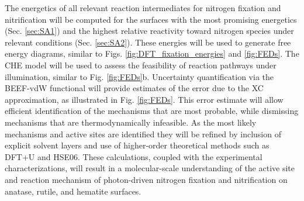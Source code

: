 The energetics of all relevant reaction intermediates for nitrogen fixation and nitrification will be computed for the surfaces with the most promising energetics (Sec. \ref{sec:SA1}) and the highest relative reactivity toward nitrogen species under relevant conditions (Sec. \ref{sec:SA2}). These energies will be used to generate free energy diagrams, similar to Figs. \ref{fig:DFT_fixation_energies} and \ref{fig:FEDs}. The CHE model will be used to assess the feasibility of reaction pathways under illumination, similar to Fig. \ref{fig:FEDs}b. Uncertainty quantification via the BEEF-vdW functional will provide estimates of the error due to the XC approximation, as illustrated in Fig. \ref{fig:FEDs}. This error estimate will allow efficient identification of the mechanisms that are most probable, while dismissing mechanisms that are thermodynamically infeasible. As the most likely mechanisms and active sites are identified they will be refined by inclusion of explicit solvent layers and use of higher-order theoretical methods such as DFT+U and HSE06. These calculations, coupled with the experimental characterizations, will result in a molecular-scale understanding of the active site and reaction mechanism of photon-driven nitrogen fixation and nitrification on anatase, rutile, and hematite surfaces.
\vspace{1mm}

